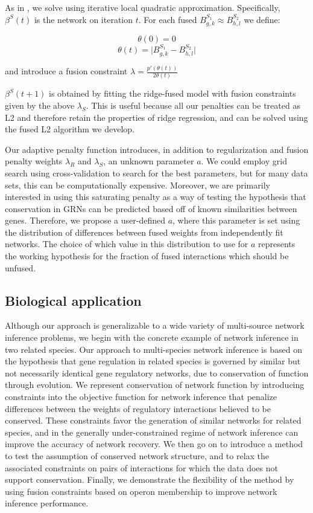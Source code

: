 \documentclass[11pt]{article}
\begin{document}
As in \cite{fan2001variable}, we solve using iterative local quadratic approximation. Specifically, $\beta^S(t)$ is the network on iteration $t$. For each fused $B^{S_1}_{g,k} \approx B^{S_2}_{h,l}$ we define:

\begin{equation} 
\theta(0)=0
\end{equation}
\begin{equation}
\theta(t) = \vert B^{S_1}_{g,k} - B^{S_2}_{h,l} \vert
\end{equation}

and introduce a fusion constraint $\lambda = \frac{p'(\theta(t))}{2\theta(t)} $

$\beta^S(t+1)$ is obtained by fitting the ridge-fused model with fusion constraints given by the above $\lambda_S$. This is useful because all our penalties can be treated as L2 and therefore retain the properties of ridge regression, and can be solved using the fused L2 algorithm we develop.

Our adaptive penalty function introduces, in addition to regularization and fusion penalty weights $\lambda_R$ and $\lambda_S$, an unknown parameter $a$.
We could employ grid search using cross-validation to search for the best parameters, but for many data sets, this can be computationally expensive. 
Moreover, we are primarily interested in using this saturating penalty as a way of testing the hypothesis that conservation in GRNs can be predicted based off of known similarities between genes. 
Therefore, we propose a user-defined $a$, where this parameter is set using the distribution of differences between fused weights from independently fit networks. The choice of which value in this distribution to use for $a$ represents the working hypothesis for the fraction of fused interactions which should be unfused.


 
\subsection{Biological application}
Although our approach is generalizable to a wide variety of multi-source network inference problems, we begin with the concrete example of network inference in two related species. 
Our approach to multi-species network inference is based on the hypothesis that gene regulation in related species is governed by similar but not necessarily identical gene regulatory networks, due to conservation of function through evolution. 
We represent conservation of network function by introducing constraints into the objective function for network inference that penalize differences between the weights of regulatory interactions believed to be conserved. 
These constraints favor the generation of similar networks for related species, and in the generally under-constrained regime of network inference can improve the accuracy of network recovery. 
We then go on to introduce a method to test the assumption of conserved network structure, and to relax the associated constraints on pairs of interactions for which the data does not support conservation. Finally, we demonstrate the flexibility of the method by using fusion constraints based on operon membership to improve network inference performance. 
\end{document}
